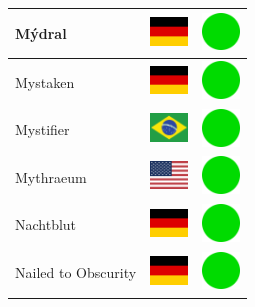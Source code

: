 \documentclass[12pt, a4paper, twoside]{report}
\begin{document}
\begin{center}
\begin{longtable}{|p{5cm}|p{2cm}|p{2cm}|}
 Mýdral                                                     & \includegraphics[width=1cm]{../4x3/de} &   \includegraphics[width=1cm]{../likes/y} \\ \hline
 Mystaken                                                   & \includegraphics[width=1cm]{../4x3/de} &   \includegraphics[width=1cm]{../likes/y} \\ \hline
 Mystifier                                                  & \includegraphics[width=1cm]{../4x3/br} &   \includegraphics[width=1cm]{../likes/y} \\ \hline
 Mythraeum                                                  & \includegraphics[width=1cm]{../4x3/us} &   \includegraphics[width=1cm]{../likes/y} \\ \hline
 Nachtblut                                                  & \includegraphics[width=1cm]{../4x3/de} &   \includegraphics[width=1cm]{../likes/y} \\ \hline
 Nailed to Obscurity                                        & \includegraphics[width=1cm]{../4x3/de} &   \includegraphics[width=1cm]{../likes/y} \\ \hline

\end{longtable}
\end{center}
\end{document}
